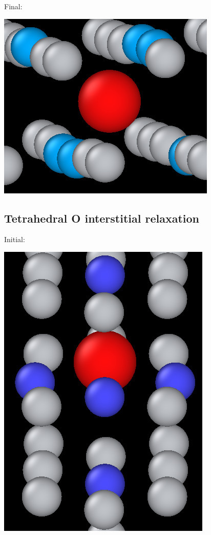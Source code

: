 \documentclass[11pt]{article}
\begin{document}
Final:
\begin{center}
\includegraphics[width=.9\linewidth]{Images/final_octahedral_ox_ovito.png}
\end{center}

\subsection{Tetrahedral O interstitial relaxation}
\label{sec:org4269fd8}

Initial:
\begin{center}
\includegraphics[width=.9\linewidth]{Images/final_model_final_tetra_ox.png}
\end{center}
\end{document}
